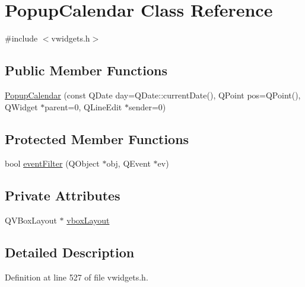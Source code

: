 \hypertarget{classPopupCalendar}{
\section{PopupCalendar Class Reference}
\label{classPopupCalendar}
}


{\ttfamily \#include $<$vwidgets.h$>$}

\subsection*{Public Member Functions}
\begin{DoxyCompactItemize}
\item 
\hyperlink{classPopupCalendar_acf6d796ec76b4afc0b87b41b4e1c1cdd}{PopupCalendar} (const QDate day=QDate::currentDate(), QPoint pos=QPoint(), QWidget $\ast$parent=0, QLineEdit $\ast$sender=0)
\end{DoxyCompactItemize}
\subsection*{Protected Member Functions}
\begin{DoxyCompactItemize}
\item 
bool \hyperlink{classPopupCalendar_a7178dfae41cf896283c7a56d3fd34e86}{eventFilter} (QObject $\ast$obj, QEvent $\ast$ev)
\end{DoxyCompactItemize}
\subsection*{Private Attributes}
\begin{DoxyCompactItemize}
\item 
QVBoxLayout $\ast$ \hyperlink{classPopupCalendar_a91fe62eeacad0afcee4da61b5c711604}{vboxLayout}
\end{DoxyCompactItemize}


\subsection{Detailed Description}


Definition at line 527 of file vwidgets.h.



